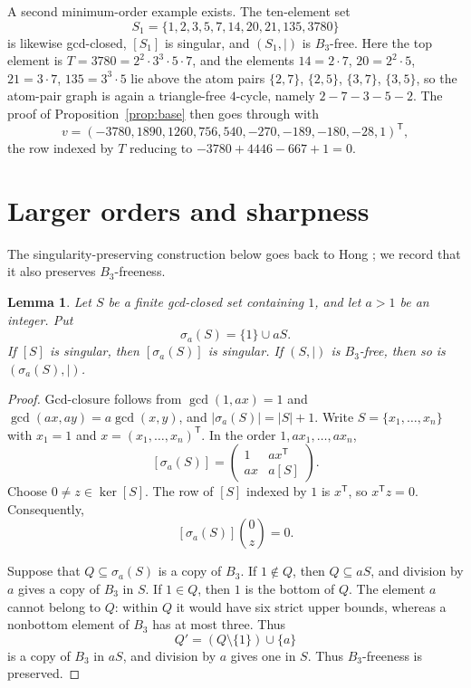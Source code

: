 \documentclass[11pt]{amsart}
\newtheorem{lemma}[theorem]{Lemma}
\begin{document}
A second minimum-order example exists. The ten-element set
\[
 S_1=\{1,2,3,5,7,14,20,21,135,3780\}
\]
is likewise gcd-closed, $[S_1]$ is singular, and $(S_1,\mid)$ is
$B_3$-free. Here the top element is $T=3780=2^2\cdot3^3\cdot5\cdot7$,
and the elements $14=2\cdot7$, $20=2^2\cdot5$, $21=3\cdot7$,
$135=3^3\cdot5$ lie above the atom pairs $\{2,7\}$, $\{2,5\}$,
$\{3,7\}$, $\{3,5\}$, so the atom-pair graph is again a triangle-free
$4$-cycle, namely $2-7-3-5-2$. The proof of
Proposition~\ref{prop:base} then goes through with
\[
 v=(-3780,1890,1260,756,540,-270,-189,-180,-28,1)^{\mathsf T},
\]
the row indexed by $T$ reducing to $-3780+4446-667+1=0$.

\section{Larger orders and sharpness}

The singularity-preserving construction below goes back to Hong
\cite{Hong1999}; we record that it also preserves $B_3$-freeness.

\begin{lemma}\label{lem:stabilization}
Let $S$ be a finite gcd-closed set containing $1$, and let $a>1$ be an
integer. Put
\[
 \sigma_a(S)=\{1\}\cup aS.
\]
If $[S]$ is singular, then $[\sigma_a(S)]$ is singular. If
$(S,\mid)$ is $B_3$-free, then so is $(\sigma_a(S),\mid)$.
\end{lemma}

\begin{proof}
Gcd-closure follows from $\gcd(1,ax)=1$ and
$\gcd(ax,ay)=a\gcd(x,y)$, and
$|\sigma_a(S)|=|S|+1$.
Write $S=\{x_1,\dots,x_n\}$ with $x_1=1$ and
$x=(x_1,\dots,x_n)^{\mathsf T}$. In the order
$1,ax_1,\dots,ax_n$,
\[
 [\sigma_a(S)]
 =
 \begin{pmatrix}
  1  & ax^{\mathsf T}\\
  ax & a[S]
 \end{pmatrix}.
\]
Choose $0\ne z\in\ker[S]$. The row of $[S]$ indexed by $1$ is
$x^{\mathsf T}$, so $x^{\mathsf T}z=0$. Consequently,
\[
 [\sigma_a(S)]\binom{0}{z}=0.
\]

Suppose that $Q\subseteq\sigma_a(S)$ is a copy of $B_3$. If
$1\notin Q$, then $Q\subseteq aS$, and division by $a$ gives a copy of
$B_3$ in $S$. If $1\in Q$, then $1$ is the bottom of $Q$. The element
$a$ cannot belong to $Q$: within $Q$ it would have six strict upper
bounds, whereas a nonbottom element of $B_3$ has at most three.
Thus
\[
 Q'=(Q\setminus\{1\})\cup\{a\}
\]
is a copy of $B_3$ in $aS$, and division by $a$ gives one in $S$.
Thus $B_3$-freeness is preserved.
\end{proof}
\end{document}
